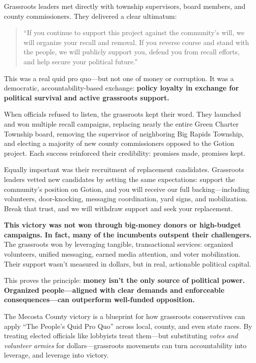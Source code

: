 Grassroots leaders met directly with township supervisors, board members, and county commissioners. They delivered a clear ultimatum: 
\begin{quote}
    ``If you continue to support this project against the community’s will, we will organize your recall and removal. If you reverse course and stand with the people, we will publicly support you, defend you from recall efforts, and help secure your political future.''
\end{quote}

This was a real quid pro quo—but not one of money or corruption. It was a democratic, accountability-based exchange: \textbf{policy loyalty in exchange for political survival and active grassroots support.}

When officials refused to listen, the grassroots kept their word. They launched and won multiple recall campaigns, replacing nearly the entire Green Charter Township board, removing the supervisor of neighboring Big Rapids Township, and electing a majority of new county commissioners opposed to the Gotion project. Each success reinforced their credibility: promises made, promises kept.

Equally important was their recruitment of replacement candidates. Grassroots leaders vetted new candidates by setting the same expectations: support the community’s position on Gotion, and you will receive our full backing—including volunteers, door-knocking, messaging coordination, yard signs, and mobilization. Break that trust, and we will withdraw support and seek your replacement.

\textbf{This victory was not won through big-money donors or high-budget campaigns. In fact, many of the incumbents outspent their challengers.} The grassroots won by leveraging tangible, transactional services: organized volunteers, unified messaging, earned media attention, and voter mobilization. Their support wasn’t measured in dollars, but in real, actionable political capital.

This proves the principle: \textbf{money isn’t the only source of political power. Organized people—aligned with clear demands and enforceable consequences—can outperform well-funded opposition.}

The Mecosta County victory is a blueprint for how grassroots conservatives can apply ``The People’s Quid Pro Quo'' across local, county, and even state races. By treating elected officials like lobbyists treat them—but substituting \emph{votes and volunteer armies} for dollars—grassroots movements can turn accountability into leverage, and leverage into victory.


